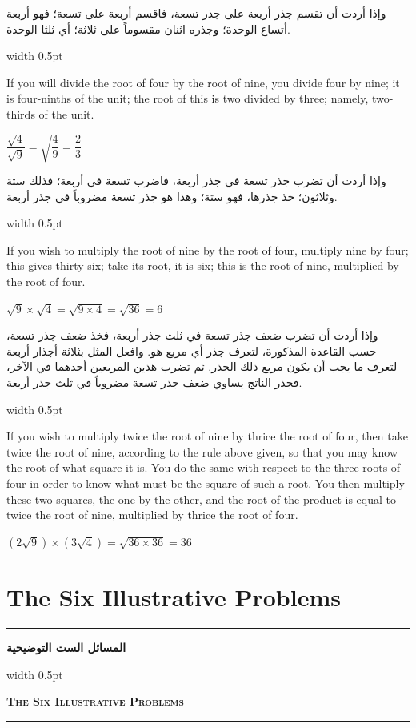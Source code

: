 \documentclass[10pt,a4paper]{book}
\newlength{\colwidth}
\newcommand{\bilingualpair}[2]{%
  \noindent
  \begin{minipage}[t]{\colwidth}
  \begin{flushright}
  \vspace{0pt}
  {\arabicfont\small #1}
  \end{flushright}
  \end{minipage}%
  \hfill\textcolor{columnsepclr}{\vrule width 0.5pt}\hfill
  \begin{minipage}[t]{\colwidth}
  \vspace{0pt}
  {\small #2}
  \end{minipage}%
  \par\vspace{0.6em}
}
\newcommand{\bilingualsectionheader}[2]{%
  \par\vspace{0.8em}
  \noindent
  \begin{minipage}[t]{\colwidth}
  \begin{flushright}
  \textbf{\arabicfont #1}
  \end{flushright}
  \end{minipage}%
  \hfill\textcolor{columnsepclr}{\vrule width 0.5pt}\hfill
  \begin{minipage}[t]{\colwidth}
  \textbf{\textsc{#2}}
  \end{minipage}%
  \par\vspace{0.5em}
}
\begin{document}
\bilingualpair{
وإذا أردت أن تقسم جذر أربعة على جذر تسعة، فاقسم أربعة على
تسعة؛ فهو أربعة أتساع الوحدة؛ وجذره اثنان مقسوماً على
ثلاثة؛ أي ثلثا الوحدة.
}{
If you will divide the root of four by the root of nine, you divide four by
nine; it is four-ninths of the unit; the root of this is two divided by
three; namely, two-thirds of the unit.

$\dfrac{\sqrt{4}}{\sqrt{9}} = \sqrt{\dfrac{4}{9}} = \dfrac{2}{3}$
}

\bilingualpair{
وإذا أردت أن تضرب جذر تسعة في جذر أربعة، فاضرب تسعة في
أربعة؛ فذلك ستة وثلاثون؛ خذ جذرها، فهو ستة؛ وهذا هو جذر
تسعة مضروباً في جذر أربعة.
}{
If you wish to multiply the root of nine by the root of four, multiply nine
by four; this gives thirty-six; take its root, it is six; this is the root
of nine, multiplied by the root of four.

$\sqrt{9} \times \sqrt{4} = \sqrt{9 \times 4} = \sqrt{36} = 6$
}

\bilingualpair{
وإذا أردت أن تضرب ضعف جذر تسعة في ثلث جذر أربعة، فخذ
ضعف جذر تسعة، حسب القاعدة المذكورة، لتعرف جذر أي مربع
هو. وافعل المثل بثلاثة أجذار أربعة لتعرف ما يجب أن يكون
مربع ذلك الجذر. ثم تضرب هذين المربعين أحدهما في الآخر،
فجذر الناتج يساوي ضعف جذر تسعة مضروباً في ثلث جذر أربعة.
}{
If you wish to multiply twice the root of nine by thrice the root of four,
then take twice the root of nine, according to the rule above given, so that
you may know the root of what square it is. You do the same with respect to
the three roots of four in order to know what must be the square of such a
root. You then multiply these two squares, the one by the other, and the root
of the product is equal to twice the root of nine, multiplied by thrice the
root of four.

$(2\sqrt{9}) \times (3\sqrt{4}) = \sqrt{36 \times 36} = 36$
}

\newpage


\chapter{The Six Illustrative Problems}
\label{ch:six-problems}

\noindent\textcolor{columnsepclr}{\rule{\textwidth}{0.6pt}}\par\vspace{0.3em}
\bilingualsectionheader{المسائل الست التوضيحية}{The Six Illustrative Problems}
\noindent\textcolor{columnsepclr}{\rule{\textwidth}{0.6pt}}\par\vspace{0.5em}
\end{document}
